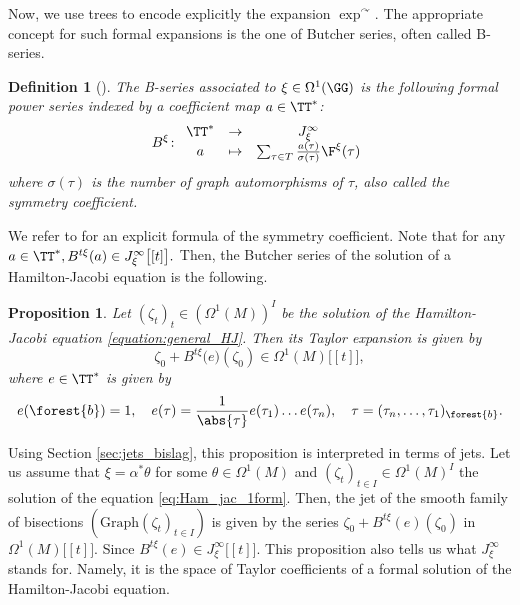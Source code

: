 \documentclass[a4paper,11pt]{article}
\newcommand{\Graph}{\text{Graph}}
\newtheorem{definition}[theorem]{Definition}
\newtheorem{proposition}[theorem]{Proposition}
\def\ts{\thinspace}
\begin{document}
Now, we use trees to encode explicitly the expansion $\exp^\curvearrowright.$ The appropriate concept for such formal expansions is the one of Butcher series, often called B-series. 
\begin{definition}[\cite{Butcher21bsa}]
The B-series associated to $\xi \in \Omega^1(\GG)$ is the following formal power series indexed by a coefficient map $a\in\TT^*$:
\[
B^\xi \colon
\begin{array}{ccc}
\TT^* & \to & J_\xi^\infty\\
a & \mapsto & \sum_{\tau\in T} \frac{a(\tau)}{\sigma(\tau)} \F^\xi(\tau)
\end{array}
\]
where $\sigma(\tau)$ is the number of graph automorphisms of $\tau$, also called the symmetry coefficient.
\end{definition}
We refer to \cite[Sec.\ts III]{Hairer06gni} for an explicit formula of the symmetry coefficient. Note that for any $a \in \TT^*,  B^{t \xi}(a) \in J_\xi^\infty \bigl[ [t] \bigr].$ Then, the Butcher series of the solution of a Hamilton-Jacobi equation is the following.
\begin{proposition}
\label{proposition:HJButcher}
Let $(\zeta_t)_t \in (\Omega^1(M))^I$ be the solution of the Hamilton-Jacobi equation \eqref{equation:general_HJ}. Then its Taylor expansion is given by
\begin{equation}\label{eq:HJButcher}
\zeta_0 + B^{t\xi}\bigl(e\bigr) (\zeta_0) \in \Omega^1(M) \bigl[ [t] \bigr],
\end{equation}
where $e \in \TT^*$ is given by
\begin{equation}\label{eq:e}
e(\forest{b})=1,\quad e(\tau)=\frac{1}{\abs{\tau}}e(\tau_1)\dots e(\tau_n),\quad \tau= (\tau_n,\dots ,\tau_1)_{\forest{b}}.
\end{equation}
\end{proposition}

Using Section \ref{sec:jets_bislag}, this proposition is interpreted in terms of jets. Let us assume that $\xi = \alpha^* \theta$ for some $\theta \in \Omega^1(M)$ and $(\zeta_t)_{t \in I} \in \Omega^1(M)^I$ the solution of the equation \eqref{eq:Ham_jac_1form}. Then, the jet of the smooth family of bisections $(\Graph(\zeta_t)_{t \in I})$ is given by the series $\zeta_0+B^{t\xi}(e)(\zeta_0)$ in $\Omega^1(M) \bigl[ [t] \bigr].$ Since $B^{t\xi}(e) \in   J_\xi^\infty \bigl[ [t] \bigr]$. This proposition also tells us what $J_\xi^\infty$ stands for. Namely, it is the space of Taylor coefficients of a formal solution of the Hamilton-Jacobi equation.
\end{document}
